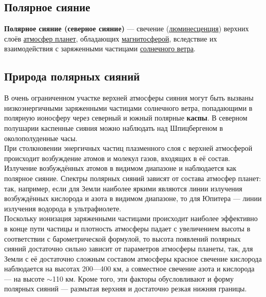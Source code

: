 \documentclass[a4paper,14pt]{article}
\def \lumURL {https://ru.wikipedia.org/wiki/\%D0\%9B\%D1\%8E\%D0\%BC\%D0\%B8\%D0\%BD\%D0\%B5\%D1\%81\%D1\%86\%D0\%B5\%D0\%BD\%D1\%86\%D0\%B8\%D1\%8F}
\def \atmURL {https://ru.wikipedia.org/wiki/\%D0\%90\%D1\%82\%D0\%BC\%D0\%BE\%D1\%81\%D1\%84\%D0\%B5\%D1\%80\%D0\%B0}
\def \magURL {https://ru.wikipedia.org/wiki/\%D0\%9C\%D0\%B0\%D0\%B3\%D0\%BD\%D0\%B8\%D1\%82\%D0\%BE\%D1\%81\%D1\%84\%D0\%B5\%D1\%80\%D0\%B0}
\def \sovURL {https://ru.wikipedia.org/wiki/\%D0\%A1\%D0\%BE\%D0\%BB\%D0\%BD\%D0\%B5\%D1\%87\%D0\%BD\%D1\%8B\%D0\%B9_\%D0\%B2\%D0\%B5\%D1\%82\%D0\%B5\%D1\%80}
\begin{document}
\setcounter{secnumdepth}{0} %

\setcounter{tocdepth}{0}    %

\subsection{Полярное сияние}
\textbf{Полярное сияние (северное сияние)} — свечение (\href{\lumURL}{люминесценция}) верхних слоёв \href{\atmURL}{атмосфер планет}, 
обладающих \href{\magURL}{магнитосферой}, вследствие их взаимодействия с заряженными частицами \href{\sovURL}{солнечного ветра}.

\setcounter{tocdepth}{3}    %

\tableofcontents

\subsection{Природа полярных сияний}
В очень ограниченном участке верхней атмосферы сияния могут быть вызваны низкоэнергичными заряженными частицами 
солнечного ветра, попадающими в полярную ионосферу через северный и южный полярные \textbf{каспы}. В северном полушарии 
каспенные сияния можно наблюдать над Шпицбергеном в околополуденные часы. \\
\indent При столкновении энергичных частиц плазменного слоя с верхней атмосферой происходит возбуждение атомов и молекул газов,
входящих в её состав. Излучение возбуждённых атомов в видимом диапазоне и наблюдается как полярное сияние. Спектры 
полярных сияний зависят от состава атмосфер планет: так, например, если для Земли наиболее яркими являются линии излучения 
возбуждённых кислорода и азота в видимом диапазоне, то для Юпитера — линии излучения водорода в ультрафиолете. \\
\indent Поскольку ионизация заряженными частицами происходит наиболее эффективно в конце пути частицы и плотность атмосферы
падает с увеличением высоты в соответствии с барометрической формулой, то высота появлений полярных сияний достаточно
сильно зависит от параметров атмосферы планеты, так, для Земли с её достаточно сложным составом атмосферы красное
свечение кислорода наблюдается на высотах 200—400 км, а совместное свечение азота и кислорода — на высоте $\sim$110 км.
Кроме того, эти факторы обусловливают и форму полярных сияний — размытая верхняя и достаточно резкая нижняя границы.
\end{document}
